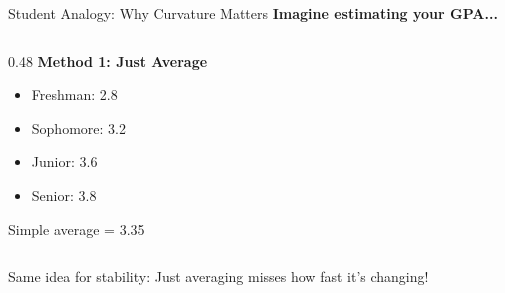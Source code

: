 \documentclass[10pt,aspectratio=169]{beamer}
\newcommand{\curvicon}{%
  \begin{tikzpicture}[scale=0.15, baseline=-0.5ex]
    \draw[thick, stableblue] (0,0) .. controls (0.5,0.5) and (1.5,-0.5) .. (2,0);
    \node[stableblue] at (1,-0.7) {\tiny $\Delta$};
  \end{tikzpicture}%
}
\begin{document}
\begin{frame}{Student Analogy: Why Curvature Matters}
  \textbf{Imagine estimating your GPA...}
  
  \vspace{0.3cm}
  \begin{columns}[T]
    \begin{column}{0.48\textwidth}
      \textbf{Method 1: Just Average}
      \begin{itemize}
        \item Freshman: 2.8
        \item Sophomore: 3.2
        \item Junior: 3.6
        \item Senior: 3.8
      \end{itemize}
      Simple average = 3.35
    \end{column}
  \end{columns}
  
  \vspace{0.5cm}
  \alert{Same idea for stability:} Just averaging misses how fast it's changing!
\end{frame}
\end{document}

